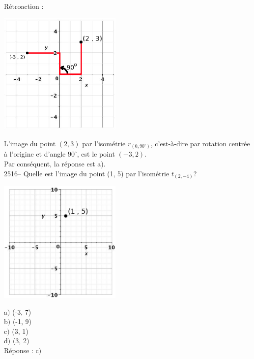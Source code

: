 \documentclass[letterpaper, 12pt]{article}
\begin{document}
R\'etroaction :\\
\begin{center}
 \includegraphics[width=6cm,bb=14 14 276 276]{Q2515r.eps}
\end{center}
L'image du point $(2, 3)$ par l'isom\'etrie $r_{(0,90^{\circ})}$, c'est-\`a-dire par rotation centr\'ee \`a l'origine et d'angle $90^{\circ}$, est le point $(-3, 2)$.\\
Par cons\'equent, la r\'eponse est a).\\

2516-- Quelle est l'image du point (1, 5) par l'isom\'etrie $t_{(2 , -4)}$?\\
\begin{center}
 \includegraphics[width=6cm,bb=14 14 415 415]{Q2516.eps}
\end{center}

a$)$ (-3, 7)\\
b$)$ (-1, 9)\\
c$)$ (3, 1)\\
d$)$ (3, 2)\\

R\'eponse : c$)$\\
\end{document}
